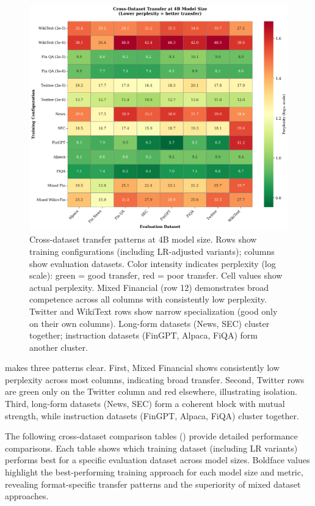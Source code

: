 \begin{figure}[htbp]
\centering
\includegraphics[width=\textwidth]{figures/heatmap_transfer.png}
\caption[Cross-Dataset Transfer Heatmap]{Cross-dataset transfer patterns at 4B model size. Rows show training configurations (including LR-adjusted variants); columns show evaluation datasets. Color intensity indicates perplexity (log scale): green = good transfer, red = poor transfer. Cell values show actual perplexity. Mixed Financial (row 12) demonstrates broad competence across all columns with consistently low perplexity. Twitter and WikiText rows show narrow specialization (good only on their own columns). Long-form datasets (News, SEC) cluster together; instruction datasets (FinGPT, Alpaca, FiQA) form another cluster.}
\label{fig:heatmap_transfer}
\end{figure}

 makes three patterns clear. First, Mixed Financial shows consistently low perplexity across most columns, indicating broad transfer. Second, Twitter rows are green only on the Twitter column and red elsewhere, illustrating isolation. Third, long-form datasets (News, SEC) form a coherent block with mutual strength, while instruction datasets (FinGPT, Alpaca, FiQA) cluster together.

The following cross-dataset comparison tables () provide detailed performance comparisons. Each table shows which training dataset (including LR variants) performs best for a specific evaluation dataset across model sizes. Boldface values highlight the best-performing training approach for each model size and metric, revealing format-specific transfer patterns and the superiority of mixed dataset approaches.

